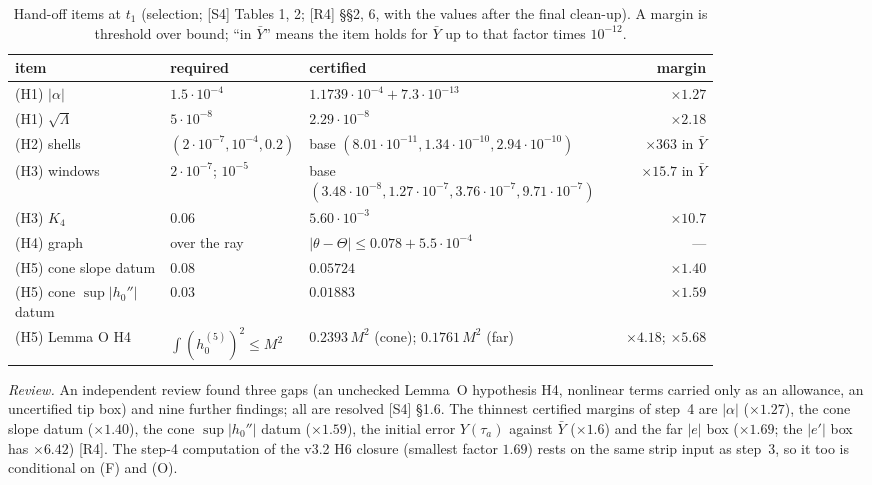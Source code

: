 \documentclass[11pt]{amsart}
\theoremstyle{definition}
\theoremstyle{remark}
\newcommand{\Lam}{\Lambda}
\newcommand{\dref}[1]{[\textsf{#1}]}
\begin{document}
\begin{table}[htbp]\centering\small
\caption{Hand-off items at $t_1$ (selection; \dref{S4} Tables 1, 2; \dref{R4} \S\S2, 6, with the values after the final clean-up). A margin is threshold over bound; ``in $\bar Y$'' means the item holds for $\bar Y$ up to that factor times $10^{-12}$.}\label{tab:handoff}
\footnotesize
\begin{tabular}{@{}p{0.22\linewidth}p{0.19\linewidth}p{0.41\linewidth}r@{}}\toprule
item & required & certified & margin\\\midrule
(H1) $|\alpha|$ & $1.5\cdot10^{-4}$ & $1.1739\cdot10^{-4}+7.3\cdot10^{-13}$ & $\times1.27$\\
(H1) $\sqrt\Lam$ & $5\cdot10^{-8}$ & $2.29\cdot10^{-8}$ & $\times2.18$\\
(H2) shells & $(2\cdot10^{-7},10^{-4},0.2)$ & base $(8.01\cdot10^{-11},1.34\cdot10^{-10},2.94\cdot10^{-10})$ & $\times363$ in $\bar Y$\\
(H3) windows & $2\cdot10^{-7}$; $10^{-5}$ & base $(3.48\cdot10^{-8},1.27\cdot10^{-7},3.76\cdot10^{-7},9.71\cdot10^{-7})$ & $\times15.7$ in $\bar Y$\\
(H3) $K_4$ & $0.06$ & $5.60\cdot10^{-3}$ & $\times10.7$\\
(H4) graph & over the ray & $|\theta-\Theta|\le0.078+5.5\cdot10^{-4}$ & ---\\
(H5) cone slope datum & $0.08$ & $0.05724$ & $\times1.40$\\
(H5) cone $\sup|h_0''|$ datum & $0.03$ & $0.01883$ & $\times1.59$\\
(H5) Lemma O H4 & $\int(h_0^{(5)})^2\le M^2$ & $0.2393\,M^2$ (cone); $0.1761\,M^2$ (far) & $\times4.18$; $\times5.68$\\\bottomrule
\end{tabular}\end{table}

\emph{Review.} An independent review found three gaps (an unchecked Lemma~O hypothesis H4, nonlinear terms carried only as an allowance, an uncertified tip box) and nine further findings; all are resolved \dref{S4} \S1.6. The thinnest certified margins of step~4 are $|\alpha|$ ($\times1.27$), the cone slope datum ($\times1.40$), the cone $\sup|h_0''|$ datum ($\times1.59$), the initial error $Y(\tau_a)$ against $\bar Y$ ($\times1.6$) and the far $|e|$ box ($\times1.69$; the $|e'|$ box has $\times6.42$) \dref{R4}. The step-4 computation of the v3.2 H6 closure (smallest factor $1.69$) rests on the same strip input as step~3, so it too is conditional on (F) and (O).
\end{document}
